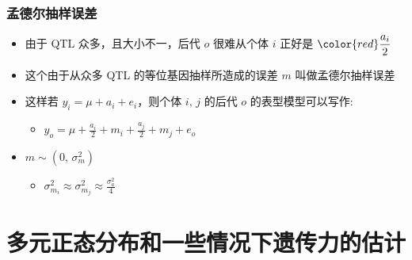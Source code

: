 \documentclass[serif,aspectratio=169]{beamer}
\begin{document}
\begin{frame}
  \frametitle{孟德尔抽样误差}
  \begin{itemize}
  \item 由于 QTL 众多，且大小不一，后代 $o$ 很难从个体 $i$ 正好是 $\displaystyle{\color{red}\frac{a_i}{2}}$
  \item 这个由于从众多 QTL 的等位基因抽样所造成的误差 $m$ 叫做{\color{cyan}孟德尔抽样误差}
  \item 这样若 $y_i = \mu + a_i + e_i$，则个体 $i,\, j$ 的后代 $o$ 的表型模型可以写作:
    \begin{itemize}
    \item $y_o = \mu + \frac{a_i}{2} + m_i + \frac{a_j}{2} + m_j + e_o$
    \end{itemize}
  \item $m\sim(0,\,\sigma_m^2)$
    \begin{itemize}
    \item $\sigma_{m_i}^2\approx\sigma_{m_j}^2\approx\frac{\sigma_a^2}{4}$
    \end{itemize}
  \end{itemize}
\end{frame}


\section{多元正态分布和一些情况下遗传力的估计}
\end{document}
